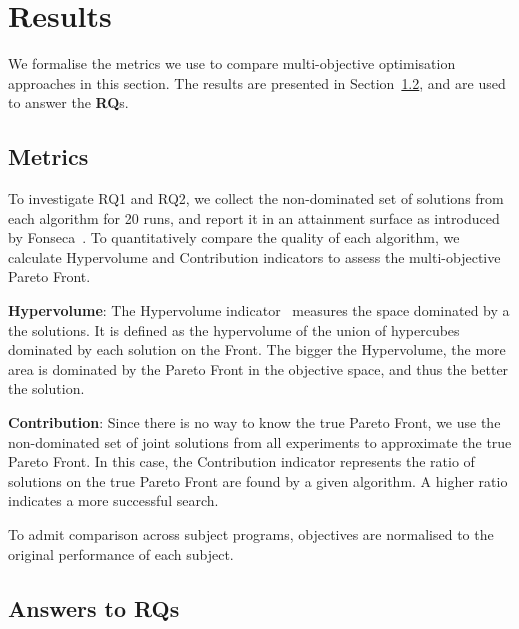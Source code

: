 
\section{Results}
\label{sec_results}


We formalise the metrics we use to compare multi-objective optimisation approaches in this section.
The results are presented in Section~\ref{sec_answers}, and are used to answer the \textbf{RQ}s.

\subsection{Metrics}
\label{sec_matrics}

To investigate RQ1 and RQ2, we collect the non-dominated set of solutions from each algorithm for 20 runs, and report it in an attainment surface as introduced by Fonseca~\cite{attainment_surface:1996}. To quantitatively compare the quality of each algorithm, we calculate Hypervolume and Contribution indicators to assess the multi-objective Pareto Front.

\textbf{Hypervolume}: The Hypervolume indicator~\cite{797969} measures the space dominated by a the solutions. It is defined as the hypervolume of the union of hypercubes dominated by each solution on the Front. The bigger the Hypervolume, the more area is dominated by the Pareto Front in the objective space, and thus the better the solution.

\textbf{Contribution}: Since there is no way to know the true Pareto Front, we use the non-dominated set of joint solutions from all experiments to approximate the true Pareto Front. In this case, the Contribution indicator represents the ratio of solutions on the true Pareto Front are found by a given algorithm. A higher ratio indicates a more successful search. 

To admit comparison across subject programs, objectives are normalised to the original performance of each subject.

\subsection{Answers to RQs}
\label{sec_answers}

\newcommand{\shallow}{Sha}
\newcommand{\all}{All}
\newcommand{\randomsearch}{Rand}
\newcommand{\nsgaii}{NSGA}
\newcommand{\sr}{\emph{\shallow\randomsearch}}
\newcommand{\sn}{\emph{\shallow\nsgaii}}
\newcommand{\dr}{\emph{\all\randomsearch}}
\newcommand{\dn}{\emph{\all\nsgaii}}

